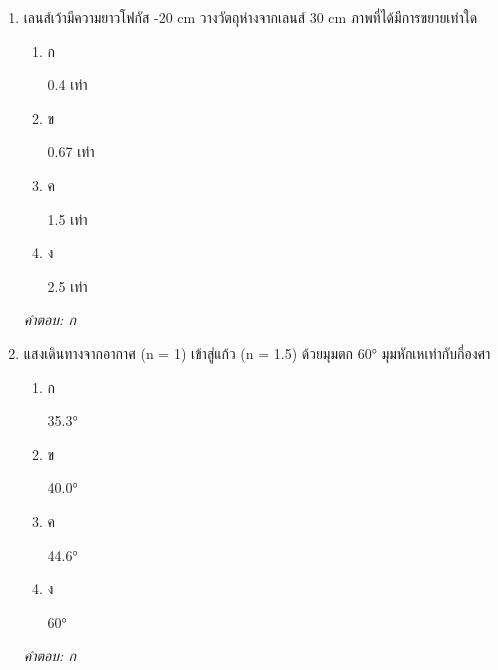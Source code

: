 \documentclass[12pt]{article}
\begin{document}
\begin{enumerate}[label=\arabic*., itemsep=0.5\baselineskip, topsep=0.5\baselineskip, leftmargin=*]
\item เลนส์เว้ามีความยาวโฟกัส -20 cm วางวัตถุห่างจากเลนส์ 30 cm ภาพที่ได้มีการขยายเท่าใด
\begin{enumerate}[label=\alph*)., itemsep=0.3\baselineskip, topsep=0.3\baselineskip]
\item ก\ 
\begin{minipage}[t]{0.9\linewidth}
\raggedright 0.4 เท่า
\end{minipage}
\item ข\ 
\begin{minipage}[t]{0.9\linewidth}
\raggedright 0.67 เท่า
\end{minipage}
\item ค\ 
\begin{minipage}[t]{0.9\linewidth}
\raggedright 1.5 เท่า
\end{minipage}
\item ง\ 
\begin{minipage}[t]{0.9\linewidth}
\raggedright 2.5 เท่า
\end{minipage}
\end{enumerate}
\vspace{-0.3\baselineskip}
\begin{small}
\textit{คำตอบ: ก}
\end{small}

\item แสงเดินทางจากอากาศ (n = 1) เข้าสู่แก้ว (n = 1.5) ด้วยมุมตก 60° มุมหักเหเท่ากับกี่องศา
\begin{enumerate}[label=\alph*)., itemsep=0.3\baselineskip, topsep=0.3\baselineskip]
\item ก\ 
\begin{minipage}[t]{0.9\linewidth}
\raggedright 35.3°
\end{minipage}
\item ข\ 
\begin{minipage}[t]{0.9\linewidth}
\raggedright 40.0°
\end{minipage}
\item ค\ 
\begin{minipage}[t]{0.9\linewidth}
\raggedright 44.6°
\end{minipage}
\item ง\ 
\begin{minipage}[t]{0.9\linewidth}
\raggedright 60°
\end{minipage}
\end{enumerate}
\vspace{-0.3\baselineskip}
\begin{small}
\textit{คำตอบ: ก}
\end{small}


\end{enumerate}
\end{document}
